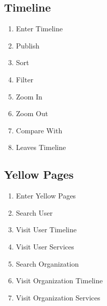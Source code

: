 \subsection{Timeline}
\label{sec:timeline}
\begin{enumerate}
\item Enter Timeline
\item Publish
\item Sort
\item Filter
\item Zoom In
\item Zoom Out
\item Compare With
\item Leaves Timeline
\end{enumerate}

\subsection{Yellow Pages}
\label{sec:timeline}

\begin{enumerate}
\item Enter Yellow Pages
\item Search User
\item Visit User Timeline
\item Visit User Services
\item Search Organization
\item Visit Organization Timeline
\item Visit Organization Services
\end{enumerate}



